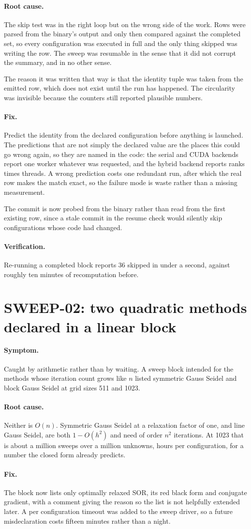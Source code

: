 \documentclass[11pt,a4paper]{report}
\newcommand{\symptom}[1]{\paragraph{Symptom.}#1}
\newcommand{\rootcause}[1]{\paragraph{Root cause.}#1}
\newcommand{\fix}[1]{\paragraph{Fix.}#1}
\newcommand{\verification}[1]{\paragraph{Verification.}#1}
\begin{document}
\rootcause{The skip test was in the right loop but on the wrong side of the work.
Rows were parsed from the binary's output and only then compared against the
completed set, so every configuration was executed in full and the only thing
skipped was writing the row. The sweep was resumable in the sense that it did
not corrupt the summary, and in no other sense.

The reason it was written that way is that the identity tuple was taken from the
emitted row, which does not exist until the run has happened. The circularity was
invisible because the counters still reported plausible numbers.}

\fix{Predict the identity from the declared configuration before anything is
launched. The predictions that are not simply the declared value are the places
this could go wrong again, so they are named in the code: the serial and CUDA
backends report one worker whatever was requested, and the hybrid backend
reports ranks times threads. A wrong prediction costs one redundant run, after
which the real row makes the match exact, so the failure mode is waste rather
than a missing measurement.

The commit is now probed from the binary rather than read from the first existing
row, since a stale commit in the resume check would silently skip configurations
whose code had changed.}

\verification{Re-running a completed block reports 36 skipped in under a second,
against roughly ten minutes of recomputation before.}

\section{SWEEP-02: two quadratic methods declared in a linear block}

\symptom{Caught by arithmetic rather than by waiting. A sweep block intended for
the methods whose iteration count grows like $n$ listed symmetric Gauss Seidel
and block Gauss Seidel at grid sizes 511 and 1023.}

\rootcause{Neither is $O(n)$. Symmetric Gauss Seidel at a relaxation factor of
one, and line Gauss Seidel, are both $1 - O(h^2)$ and need of order $n^2$
iterations. At 1023 that is about a million sweeps over a million unknowns, hours
per configuration, for a number the closed form already predicts.}

\fix{The block now lists only optimally relaxed SOR, its red black form and
conjugate gradient, with a comment giving the reason so the list is not helpfully
extended later. A per configuration timeout was added to the sweep driver, so a
future misdeclaration costs fifteen minutes rather than a night.}
\end{document}
